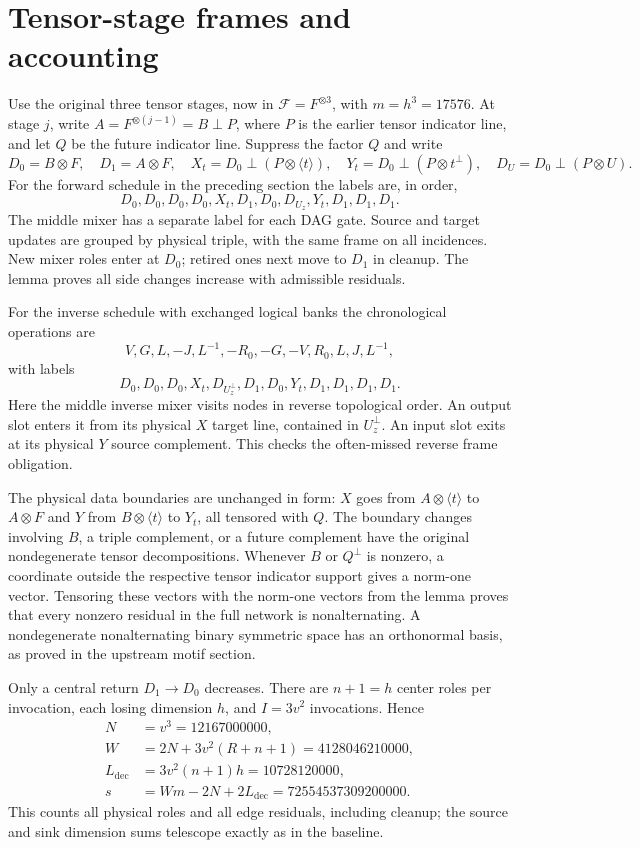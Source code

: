 \documentclass[11pt]{article}
\begin{document}
\section{Tensor-stage frames and accounting}
Use the original three tensor stages, now in $\mathcal F=F^{\otimes3}$,
with $m=h^3=17576$. At stage $j$, write
$A=F^{\otimes(j-1)}=B\perp P$, where $P$ is the earlier tensor indicator
line, and let $Q$ be the future indicator line. Suppress the factor $Q$ and
write
\[
 D_0=B\otimes F,\quad D_1=A\otimes F,\quad
 X_t=D_0\perp(P\otimes\langle t\rangle),\quad
 Y_t=D_0\perp(P\otimes t^\perp),\quad
 D_U=D_0\perp(P\otimes U).
\]
For the forward schedule in the preceding section the labels are, in order,
\[
 D_0,D_0,D_0,D_0,X_t,D_1,D_0,D_{U_z},Y_t,D_1,D_1,D_1.
\]
The middle mixer has a separate label for each DAG gate. Source and target
updates are grouped by physical triple, with the same frame on all incidences.
New mixer roles enter at $D_0$; retired ones next move to $D_1$ in cleanup.
The lemma proves all side changes increase with admissible residuals.

For the inverse schedule with exchanged logical banks the chronological
operations are
\[
 V,G,L,-J,L^{-1},-R_0,-G,-V,R_0,L,J,L^{-1},
\]
with labels
\[
 D_0,D_0,D_0,X_t,D_{U_z^\perp},D_1,D_0,Y_t,D_1,D_1,D_1,D_1.
\]
Here the middle inverse mixer visits nodes in reverse topological order.
An output slot enters it from its physical $X$ target line, contained in
$U_z^\perp$. An input slot exits at its physical $Y$ source complement.
This checks the often-missed reverse frame obligation.

The physical data boundaries are unchanged in form:
$X$ goes from $A\otimes\langle t\rangle$ to $A\otimes F$ and $Y$ from
$B\otimes\langle t\rangle$ to $Y_t$, all tensored with $Q$.
The boundary changes involving $B$, a triple complement, or a future
complement have the original nondegenerate tensor decompositions.
Whenever $B$ or $Q^\perp$ is nonzero, a coordinate outside the respective
tensor indicator support gives a norm-one vector. Tensoring these vectors
with the norm-one vectors from the lemma proves that every nonzero residual
in the full network is nonalternating. A nondegenerate nonalternating binary
symmetric space has an orthonormal basis, as proved in the upstream motif
section.

Only a central return $D_1\to D_0$ decreases. There are $n+1=h$ center roles
per invocation, each losing dimension $h$, and $I=3v^2$ invocations. Hence
\begin{align*}
 N&=v^3=12167000000,\\
 W&=2N+3v^2(R+n+1)=4128046210000,\\
 L_{\mathrm{dec}}&=3v^2(n+1)h=10728120000,\\
 s&=Wm-2N+2L_{\mathrm{dec}}=72554537309200000.
\end{align*}
This counts all physical roles and all edge residuals, including cleanup;
the source and sink dimension sums telescope exactly as in the baseline.
\end{document}
